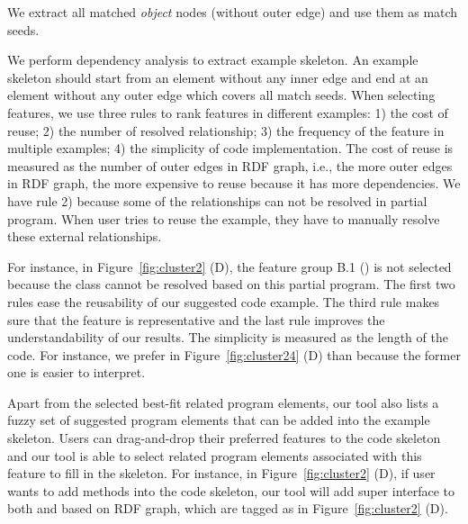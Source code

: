 
We extract all matched {\it object} nodes (without outer edge) and use them as  match seeds. 

 We perform dependency analysis to  extract example skeleton.  An example skeleton should start from an element without any inner edge and end at an element without any outer edge which covers all match seeds. 
When selecting features, we use three rules to rank features in different examples: 1) the cost of reuse; 2) the number of resolved relationship; 3) the frequency of the feature in multiple examples; 4) the simplicity of code implementation. 
The cost of reuse is measured as the number of outer edges in RDF graph, i.e., the more outer edges in RDF graph, the more expensive to reuse because it has more dependencies. We have rule 2) because  some of the relationships can not be resolved in partial program. When user tries to reuse the example, they have to manually resolve these external relationships. 

For instance, in Figure~\ref{fig:cluster2} (D), the feature group B.1 () is not selected because the class  cannot be resolved based on this partial program. The first two rules ease the reusability of our suggested code example. The third rule makes sure that the feature is representative and the last rule improves the understandability of our results. The simplicity is measured as the length of the code. For instance, we prefer  in Figure~\ref{fig:cluster24} (D) than  because the former one is easier to interpret. 


  Apart from the selected best-fit related program elements, our tool also lists a fuzzy set of suggested program elements that can be added into the example skeleton. Users can drag-and-drop their preferred features to the code skeleton and our tool is able to select related program elements associated with this feature to fill in the skeleton. For instance, in Figure~\ref{fig:cluster2} (D), if user wants to add  methods into the code skeleton, our tool will add super interface  to both  and  based on RDF graph, which are tagged as  in Figure~\ref{fig:cluster2} (D).



